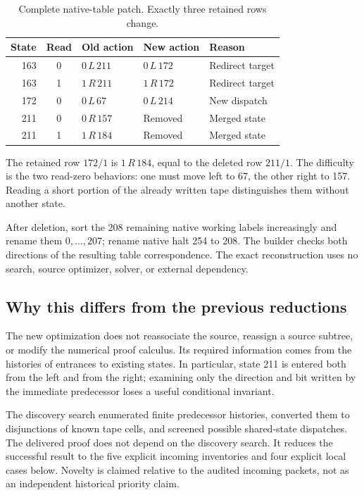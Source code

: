 \documentclass[11pt,letterpaper]{article}
\newcommand{\act}[3]{#1\,#2\,#3}
\begin{document}
\begin{table}[ht]
\centering
\begin{tabular}{@{}rclll@{}}
\toprule
State & Read & Old action & New action & Reason\\
\midrule
163 & 0 & $\act0L{211}$ & $\act0L{172}$ & Redirect target\\
163 & 1 & $\act1R{211}$ & $\act1R{172}$ & Redirect target\\
172 & 0 & $\act0L{67}$ & $\act0L{214}$ & New dispatch\\
211 & 0 & $\act0R{157}$ & Removed & Merged state\\
211 & 1 & $\act1R{184}$ & Removed & Merged state\\
\bottomrule
\end{tabular}
\caption{Complete native-table patch. Exactly three retained rows change.}
\label{tab:patch}
\end{table}

The retained row $172/1$ is $\act1R{184}$, equal to the deleted row
$211/1$. The difficulty is the two read-zero behaviors: one must move left
to 67, the other right to 157. Reading a short portion of the already
written tape distinguishes them without another state.

After deletion, sort the 208 remaining native working labels increasingly
and rename them $0,\ldots,207$; rename native halt 254 to 208.
The builder checks both directions of the resulting table correspondence.
The exact reconstruction uses no search, source optimizer, solver, or
external dependency.

\subsection{Why this differs from the previous reductions}
The new optimization does not reassociate the source, reassign a source
subtree, or modify the numerical proof calculus. Its required information
comes from the histories of entrances to existing states. In particular,
state 211 is entered both from the left and from the right; examining only
the direction and bit written by the immediate predecessor loses a useful
conditional invariant.

The discovery search enumerated finite predecessor histories, converted them
to disjunctions of known tape cells, and screened possible shared-state
dispatches. The delivered proof does not depend on the discovery search.
It reduces the successful result to the five explicit incoming inventories
and four explicit local cases below. Novelty is claimed relative to the
audited incoming packets, not as an independent historical priority claim.
\end{document}
